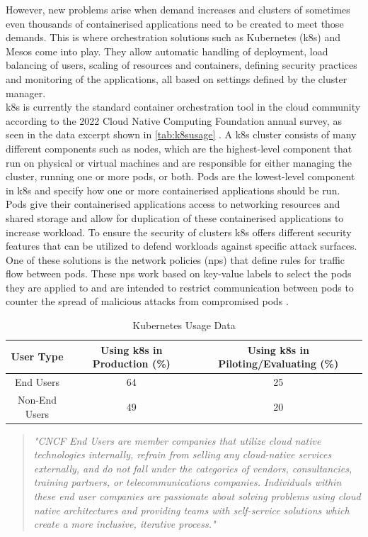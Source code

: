  However, new problems arise when demand increases and clusters of sometimes even thousands of containerised applications need to be created to meet those demands. This is where orchestration solutions such as Kubernetes (\acrshort{k8s}) \cite{Bernstein2014} and Mesos \cite{Mesos} come into play. They allow automatic handling of deployment, load balancing of users, scaling of resources and containers, defining security practices and monitoring of the applications, all based on settings defined by the cluster manager.
\\[10pt]

\acrshort{k8s} is currently the standard container orchestration tool in the cloud community according to the 2022 Cloud Native Computing Foundation annual survey, as seen in the data excerpt shown in \autoref{tab:k8susage} \cite{CNCFSurvey}. A \acrshort{k8s} cluster consists of many different components such as nodes, which are the highest-level component that run on physical or virtual machines and are responsible for either managing the cluster, running one or more pods, or both. Pods are the lowest-level component in \acrshort{k8s} and specify how one or more containerised applications should be run. Pods give their containerised applications access to networking resources and shared storage and allow for duplication of these containerised applications to increase workload. To ensure the security of clusters \acrshort{k8s} offers different security features that can be utilized to defend workloads against specific attack surfaces. One of these solutions is the network policies (\acrshort{np}s) that define rules for traffic flow between pods. These \acrshort{np}s work based on key-value labels to select the pods they are applied to and are intended to restrict communication between pods to counter the spread of malicious attacks from compromised pods \cite{nps}.
\\[10pt]
\begin{table}[h]
    \centering
    \begin{tabular}{|c|c|c|}
        \hline
        \textbf{User Type} & \textbf{Using \acrshort{k8s} in Production (\%)} & \textbf{Using \acrshort{k8s} in Piloting/Evaluating (\%)} \\
        \hline
        End Users & 64 & 25 \\ 
        Non-End Users & 49 & 20 \\
        \hline
    \end{tabular}
    \caption{Kubernetes Usage Data \cite{CNCFSurvey}}
    \label{tab:k8susage}
\end{table}
\begin{quote}
\textit{"CNCF End Users are member companies that utilize cloud native technologies internally, refrain from selling any cloud-native services externally, and do not fall under the categories of vendors, consultancies, training partners, or telecommunications companies. Individuals within these end user companies are passionate about solving problems using cloud native architectures and providing teams with self-service solutions which create a more inclusive, iterative process." \cite{CNCFSurvey}}
\end{quote}

